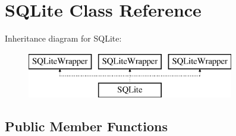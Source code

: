 \hypertarget{class_s_q_lite}{}\section{S\+Q\+Lite Class Reference}
\label{class_s_q_lite}
Inheritance diagram for S\+Q\+Lite\+:\begin{figure}[H]
\begin{center}
\leavevmode
\includegraphics[height=2.000000cm]{d4/dd1/class_s_q_lite}
\end{center}
\end{figure}
\subsection*{Public Member Functions}
